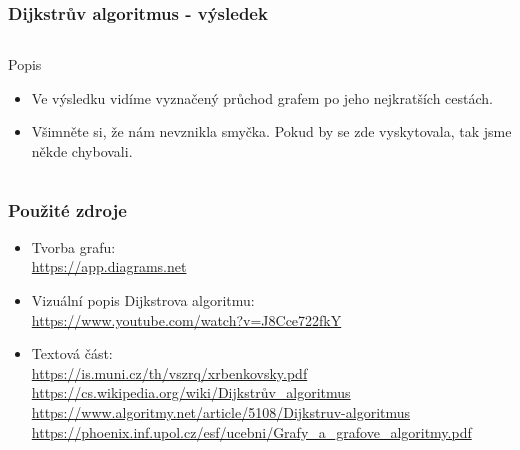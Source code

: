 \documentclass{beamer}
\begin{document}
\begin{frame}
    \frametitle{Dijkstrův algoritmus - výsledek}
    \begin{columns}
        \begin{block}{Popis}
            \begin{itemize}
                \item Ve výsledku vidíme vyznačený průchod grafem po jeho nejkratších cestách.
                \item Všimněte si, že nám nevznikla smyčka. Pokud by se zde vyskytovala, tak jsme někde chybovali.
            \end{itemize}
        \end{block}
    \end{columns}
\end{frame}

\begin{frame}
    \frametitle{Použité zdroje}
    \begin{itemize}
        \item Tvorba grafu: \\ \small{\url{https://app.diagrams.net}}
        \item Vizuální popis Dijkstrova algoritmu: \\ \url{https://www.youtube.com/watch?v=J8Cce722fkY}
        \item Textová část: \\ \url{https://is.muni.cz/th/vszrq/xrbenkovsky.pdf} \\
        \url{https://cs.wikipedia.org/wiki/Dijkstrův_algoritmus} \\
        \url{https://www.algoritmy.net/article/5108/Dijkstruv-algoritmus} \\
        \url{https://phoenix.inf.upol.cz/esf/ucebni/Grafy_a_grafove_algoritmy.pdf}
    \end{itemize}
\end{frame}
\end{document}
